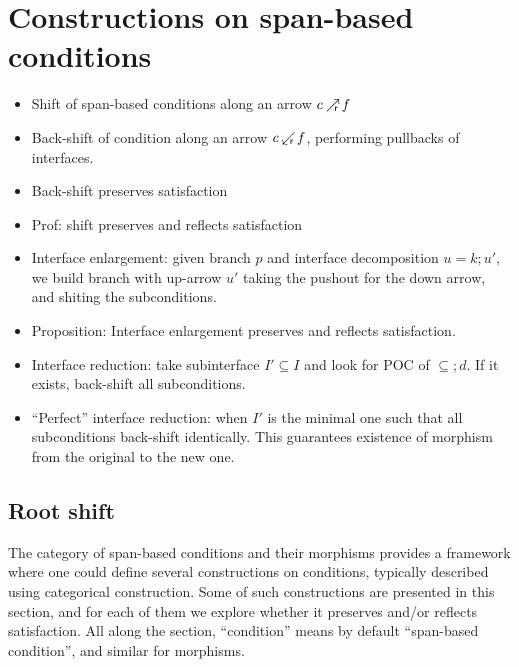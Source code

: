 \section{Constructions on span-based conditions}



\begin{itemize}
  \item Shift of span-based conditions along an arrow $c\mathbin{\nearrow_{\!\!\!\mathsf r}} f$
  \item Back-shift of condition along an arrow $c\mathbin{\swarrow_{\!\!\!\mathsf r}} f$, performing pullbacks of interfaces. 
  \item Back-shift preserves satisfaction 
  \item Prof: shift preserves and reflects satisfaction
  \item Interface enlargement: given  branch $p$ and interface decomposition $u = k;u'$, we build branch with up-arrow $u'$ taking the pushout for the down arrow, and shiting the subconditions.
  \item Proposition: Interface enlargement preserves and reflects satisfaction.
  \item Interface reduction: take subinterface $I' \subseteq I$ and look for POC of $\subseteq ; d$. If it exists, back-shift all subconditions. 
  \item ``Perfect'' interface reduction: when $I'$ is the minimal one such that all subconditions back-shift identically. This guarantees existence of morphism from the original to the new one. 
\end{itemize}  

\subsection{Root shift}

The category of span-based conditions and their morphisms provides a framework 
where one could define several constructions on conditions, typically described using categorical construction. Some of such constructions are presented in this section, and for each of them we explore whether it preserves and/or reflects satisfaction. All along the section, ``condition'' means by default ``span-based condition'', and similar for morphisms. 


